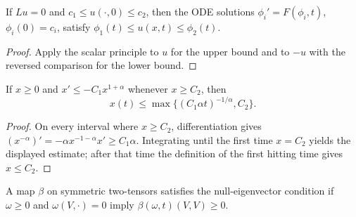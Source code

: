 \begin{theorem}
\label{thm:chow-ii-scalar-two-sided}


If $Lu=0$ and $c_1\le u(\cdot,0)\le c_2$, then the ODE solutions
\(\phi_i'=F(\phi_i,t)\), \(\phi_i(0)=c_i\), satisfy
\(\phi_1(t)\le u(x,t)\le\phi_2(t)\).
\end{theorem}
\begin{proof}
\sketch
Apply the scalar principle to $u$ for the upper bound and to $-u$ with the
reversed comparison for the lower bound.
\end{proof}

\begin{example}
\label{ex:chow-ii-ode-decay}

If $x\ge0$ and $x'\le-C_1x^{1+\alpha}$ whenever $x\ge C_2$, then
\[
x(t)\le\max\{(C_1\alpha t)^{-1/\alpha},C_2\}.
\]
\end{example}
\begin{proof}
\sketch
On every interval where $x\ge C_2$, differentiation gives
\((x^{-\alpha})'=-\alpha x^{-1-\alpha}x'\ge C_1\alpha\).  Integrating until
the first time $x=C_2$ yields the displayed estimate; after that time the
definition of the first hitting time gives $x\le C_2$.
\end{proof}

\begin{definition}
\label{def:chow-ii-null-eigenvector}

A map $\beta$ on symmetric two-tensors satisfies the null-eigenvector condition
if $\omega\ge0$ and $\omega(V,\cdot)=0$ imply $\beta(\omega,t)(V,V)\ge0$.
\end{definition}

